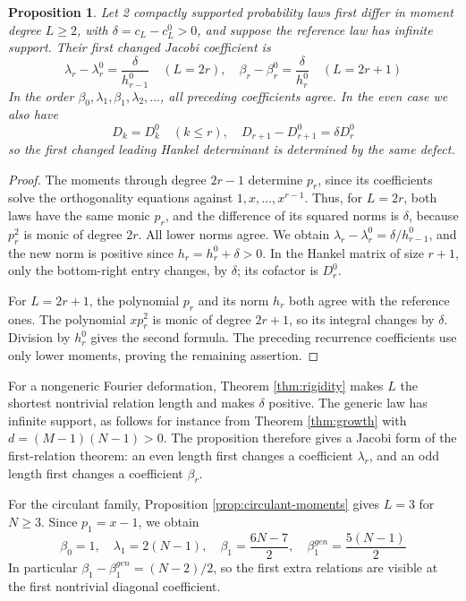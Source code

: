 \documentclass[11pt,reqno]{amsart}
\newtheorem{prop}[thm]{Proposition}
\theoremstyle{definition}
\numberwithin{equation}{section}
\begin{document}
\begin{prop}\label{prop:jacobi-defect}
Let 2 compactly supported probability laws first differ in moment degree $L\geq2$, with $\delta=c_L-c_L^0>0$, and suppose the reference law has infinite support. Their first changed Jacobi coefficient is
$$\lambda_r-\lambda_r^0=\frac\delta{h_{r-1}^0}\quad(L=2r),\quad \beta_r-\beta_r^0=\frac\delta{h_r^0}\quad(L=2r+1)$$
In the order $\beta_0,\lambda_1,\beta_1,\lambda_2,\ldots$, all preceding coefficients agree. In the even case we also have
$$D_k=D_k^0\quad(k\leq r),\quad D_{r+1}-D_{r+1}^0=\delta D_r^0$$
so the first changed leading Hankel determinant is determined by the same defect.
\end{prop}
\begin{proof}
The moments through degree $2r-1$ determine $p_r$, since its coefficients solve the orthogonality equations against $1,x,\ldots,x^{r-1}$. Thus, for $L=2r$, both laws have the same monic $p_r$, and the difference of its squared norms is $\delta$, because $p_r^2$ is monic of degree $2r$. All lower norms agree. We obtain $\lambda_r-\lambda_r^0=\delta/h_{r-1}^0$, and the new norm is positive since $h_r=h_r^0+\delta>0$. In the Hankel matrix of size $r+1$, only the bottom-right entry changes, by $\delta$; its cofactor is $D_r^0$.

For $L=2r+1$, the polynomial $p_r$ and its norm $h_r$ both agree with the reference ones. The polynomial $xp_r^2$ is monic of degree $2r+1$, so its integral changes by $\delta$. Division by $h_r^0$ gives the second formula. The preceding recurrence coefficients use only lower moments, proving the remaining assertion.
\end{proof}

For a nongeneric Fourier deformation, Theorem \ref{thm:rigidity} makes $L$ the shortest nontrivial relation length and makes $\delta$ positive. The generic law has infinite support, as follows for instance from Theorem \ref{thm:growth} with $d=(M-1)(N-1)>0$. The proposition therefore gives a Jacobi form of the first-relation theorem: an even length first changes a coefficient $\lambda_r$, and an odd length first changes a coefficient $\beta_r$.

For the circulant family, Proposition \ref{prop:circulant-moments} gives $L=3$ for $N\geq3$. Since $p_1=x-1$, we obtain
$$\beta_0=1,\quad \lambda_1=2(N-1),\quad \beta_1=\frac{6N-7}2,\quad \beta_1^{gen}=\frac{5(N-1)}2$$
In particular $\beta_1-\beta_1^{gen}=(N-2)/2$, so the first extra relations are visible at the first nontrivial diagonal coefficient.
\end{document}
